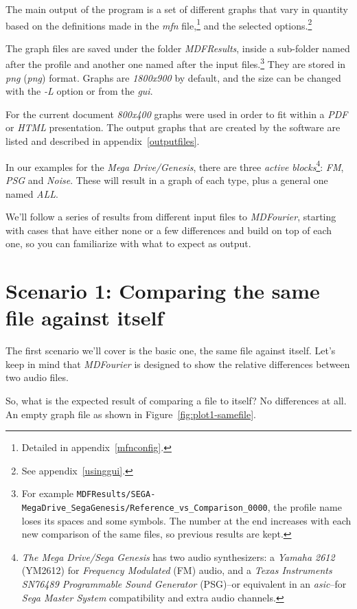 \documentclass[10pt,a4paper]{report}
\newcommand{\define}[1]{\textit{\acrlong{#1}} (\textit{\acrshort{#1}})}
\newcommand{\ac}[1]{\textit{\mbox{\acrshort{#1}}}}
\begin{document}
The main output of the program is a set of different graphs that vary in quantity based on the definitions made in the \textit{mfn} file,\footnote{Detailed in appendix~\ref{mfnconfig}.} and the selected options.\footnote{See appendix~\ref{usinggui}.}

The graph files are saved under the folder \textit{MDFResults}, inside a sub-folder named after the profile and another one named after the input files.\footnote{For example \nolinkurl{MDFResults/SEGA-MegaDrive_SegaGenesis/Reference_vs_Comparison_0000}, the profile name loses its spaces and some symbols. The number at the end increases with each new comparison of the same files, so previous results are kept.} They are stored in \define{png} format. Graphs are \textit{1800x900} by default, and the size can be changed with the \textit{-L} option or from the \ac{gui}.

For the current document \textit{800x400} graphs were used in order to fit within a \textit{PDF} or \textit{HTML} presentation. The output graphs that are created by the software are listed and described in appendix~\ref{outputfiles}.

In our examples for the \textit{Mega Drive/Genesis}, there are three \textit{active blocks}\footnote{\textit{The Mega Drive/Sega Genesis} has two audio synthesizers: a \textit{Yamaha 2612} (YM2612) for \textit{Frequency Modulated} (FM) audio, and a \textit{Texas Instruments SN76489 Programmable Sound Generator} (PSG)--or equivalent in an \ac{asic}--for \textit{Sega Master System} compatibility and extra audio channels.}: \textit{FM}, \textit{PSG} and \textit{Noise}. These will result in a graph of each type, plus a general one named \textit{ALL}.

We'll follow a series of results from different input files to \textit{MDFourier}, starting with cases that have either none or a few differences and build on top of each one, so you can familiarize with what to expect as output.

\section{Scenario 1: Comparing the same file against itself}
\label{scenario1}

The first scenario we'll cover is the basic one, the same file against itself. Let's keep in mind that \textit{MDFourier} is designed to show the relative differences between two audio files.

So, what is the expected result of comparing a file to itself? No differences at all. An empty graph file as shown in Figure~\ref{fig:plot1-samefile}.
\end{document}
